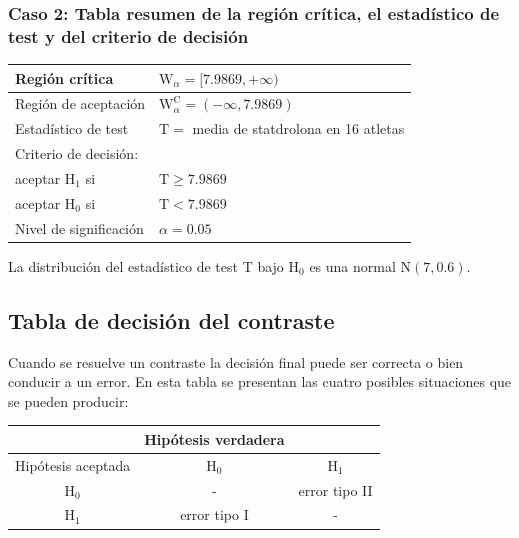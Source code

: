 \documentclass[
]{article}
\begin{document}
\subsubsection{Caso 2: Tabla resumen de la región crítica, el estadístico de test y del criterio de decisión}\label{caso-2-tabla-resumen-de-la-regiuxf3n-cruxedtica-el-estaduxedstico-de-test-y-del-criterio-de-decisiuxf3n}

\begin{longtable}[]{@{}
  >{\raggedright\arraybackslash}p{}
  >{\centering\arraybackslash}p{}@{}}
\toprule\noalign{}
\begin{minipage}[b]{\linewidth}\raggedright
Región crítica
\end{minipage} & \begin{minipage}[b]{\linewidth}\centering
\(\mathrm{W}_{\alpha}=[7.9869,+\infty)\)
\end{minipage} \\
\midrule\noalign{}
\endhead
\bottomrule\noalign{}
\endlastfoot
Región de aceptación & \(\mathrm{W}_{\alpha}^{\mathrm{C}}=(-\infty, 7.9869)\) \\
Estadístico de test & \(\mathrm{T}=\) media de statdrolona en 16 atletas \\
Criterio de decisión: & \\
aceptar \(\mathrm{H}_{1}\) si & \(\mathrm{T} \geq 7.9869\) \\
aceptar \(\mathrm{H}_{0}\) si & \(\mathrm{T}<7.9869\) \\
Nivel de significación & \(\alpha=0.05\) \\
\end{longtable}

La distribución del estadístico de test T bajo \(\mathrm{H}_{0}\) es una normal \(\mathrm{N}(7,0.6)\).

\subsection{Tabla de decisión del contraste}\label{tabla-de-decisiuxf3n-del-contraste}

Cuando se resuelve un contraste la decisión final puede ser correcta o bien conducir a un error. En esta tabla se presentan las cuatro posibles situaciones que se pueden producir:

\begin{longtable}[]{@{}ccc@{}}
\toprule\noalign{}
& Hipótesis verdadera & \\
\midrule\noalign{}
\endhead
\bottomrule\noalign{}
\endlastfoot
Hipótesis aceptada & \(\mathrm{H}_{0}\) & \(\mathrm{H}_{1}\) \\
\(\mathrm{H}_{0}\) & - & error tipo II \\
\(\mathrm{H}_{1}\) & error tipo I & - \\
\end{longtable}
\end{document}
